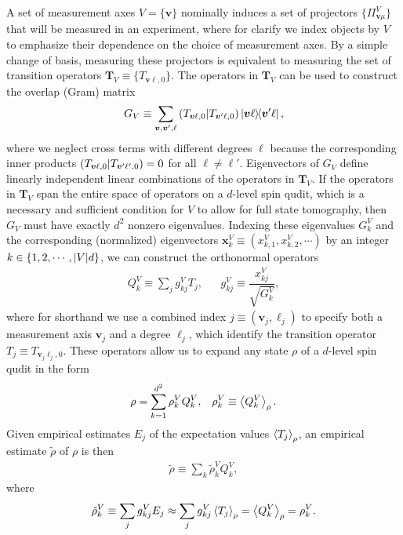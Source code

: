 \documentclass[notitlepage,twocolumn]{revtex4-2}
\newcommand{\f}[2]{\dfrac{#1}{#2}} %
\newcommand{\p}[1]{\left(#1\right)} %
\renewcommand{\set}[1]{\{#1\}} %
\newcommand{\bk}{\Braket} %
\renewcommand{\v}{\bm} %
\newcommand{\1}{\mathds{1}}
\def\obk#1{\mathinner{({#1})}}
\begin{document}
A set of measurement axes $V=\set{\v v}$ nominally induces a set of projectors $\set{\Pi_{\v v\mu}^V}$ that will be measured in an experiment, where for clarify we index objects by $V$ to emphasize their dependence on the choice of measurement axes.
By a simple change of basis, measuring these projectors is equivalent to measuring the set of transition operators $\v T_V\equiv\set{T_{\v v\ell,0}}$.
The operators in $\v T_V$ can be used to construct the overlap (Gram) matrix
\begin{align}
  G_V \equiv \sum_{\v v,\v v',\ell}
  \obk{T_{\v v\ell,0}|T_{\v v'\ell,0}} \op{\v v\ell}{\v v'\ell},
  \label{eq:overlap_matrix}
\end{align}
where we neglect cross terms with different degrees $\ell$ because the corresponding inner products $\obk{T_{\v v\ell,0}|T_{\v v'\ell',0}}=0$ for all $\ell\ne\ell'$.
Eigenvectors of $G_V$ define linearly independent linear combinations of the operators in $\v T_V$.
If the operators in $\v T_V$ span the entire space of operators on a $d$-level spin qudit, which is a necessary and sufficient condition for $V$ to allow for full state tomography, then $G_V$ must have exactly $d^2$ nonzero eigenvalues.
Indexing these eigenvalues $G^V_k$ and the corresponding (normalized) eigenvectors $\v x^V_k\equiv(x^V_{k,1},x^V_{k,2},\cdots)$ by an integer $k\in\set{1,2,\cdots,\abs{V}d}$, we can construct the orthonormal operators
\begin{align}
  Q^V_k \equiv \sum_j g^V_{kj} T_j,
  &&
  g^V_{kj} \equiv \f{x^V_{kj}}{\sqrt{G^V_k}},
\end{align}
where for shorthand we use a combined index $j\equiv\p{\v v_j,\ell_j}$ to specify both a measurement axis $\v v_j$ and a degree $\ell_j$, which identify the transition operator $T_j\equiv T_{\v v_j\ell_j,0}$.
These operators allow us to expand any state $\rho$ of a $d$-level spin qudit in the form
\begin{align}
  \rho = \sum_{k=1}^{d^2} \rho_k^V Q_k^V,
  &&
  \rho_k^V \equiv \bk{Q^V_k}_\rho.
\end{align}
Given empirical estimates $E_j$ of the expectation values $\bk{T_j}_\rho$, an empirical estimate $\tilde\rho$ of $\rho$ is then
\begin{align}
  \tilde\rho \equiv \sum_k \tilde\rho^V_k Q^V_k,
  \label{eq:reconstructed_state}
\end{align}
where
\begin{align}
  \tilde\rho^V_k \equiv \sum_j g^V_{kj} E_j
  \approx \sum_j g^V_{kj} \bk{T_j}_\rho
  = \bk{Q^V_k}_\rho
  = \rho^V_k.
\end{align}
\end{document}
